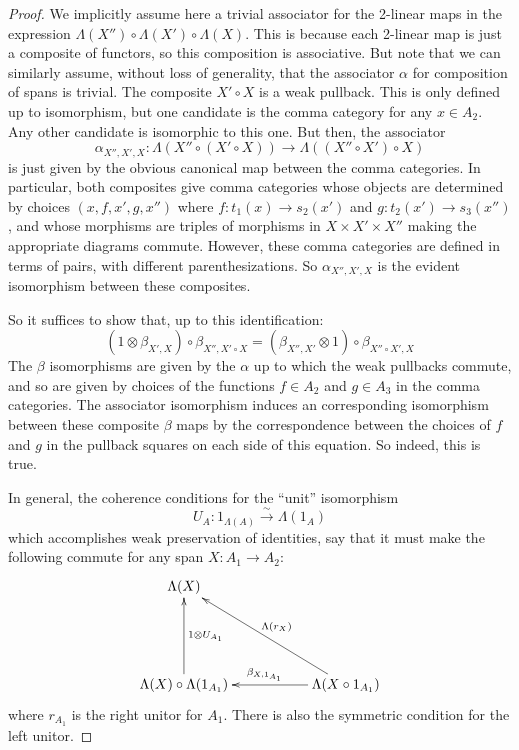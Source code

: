 \documentclass[10pt]{amsart}
\numberwithin{theorem}{subsection}
\newcommand{\ra}{\mathop{\rightarrow}}
\newcommand{\FV}{\Lambda}
\begin{document}
\begin{proof}
We implicitly assume here a trivial associator for the 2-linear maps
in the expression $\FV(X'') \circ \FV(X') \circ \FV(X)$.  This is
because each 2-linear map is just a composite of functors, so this
composition is associative.  But note that we can similarly assume,
without loss of generality, that the associator $\alpha$ for
composition of spans is trivial.  The composite $X' \circ X$ is a weak
pullback.  This is only defined up to isomorphism, but one candidate
is the comma category for any $x \in A_2$.  Any other candidate is
isomorphic to this one.  But then, the associator
\begin{equation}
\alpha_{X'',X',X} : \FV( X'' \circ (X' \circ X) ) \ra \FV( (X'' \circ X') \circ X )
\end{equation}
is just given by the obvious canonical map between the comma
categories.  In particular, both composites give comma categories
whose objects are determined by choices $(x,f,x',g,x'')$ where $f :
t_1(x) \ra s_2(x')$ and $g : t_2(x') \ra s_3(x'')$, and whose
morphisms are triples of morphisms in $X \times X' \times X''$ making
the appropriate diagrams commute.  However, these comma categories are
defined in terms of pairs, with different parenthesizations.  So
$\alpha_{X'',X',X}$ is the evident isomorphism between these
composites.

So it suffices to show that, up to this identification:
\begin{equation}
(1 \otimes \beta_{X',X}) \circ \beta_{X'',X'\circ X} = (\beta_{X'',X'} \otimes 1) \circ \beta_{X'' \circ X',X}
\end{equation}
The $\beta$ isomorphisms are given by the $\alpha$ up to which the weak pullbacks commute, and so are given by choices of the functions $f \in A_2$ and $g \in A_3$ in the comma categories.  The associator isomorphism induces an corresponding isomorphism between these composite $\beta$ maps by the correspondence between the choices of $f$ and $g$ in the pullback squares on each side of this equation.  So indeed, this is true.

In general, the coherence conditions for the ``unit'' isomorphism
\begin{equation}
U_A : 1_{\FV(A)} \stackrel{\sim}{\ra} \FV(1_A)
\end{equation}
which accomplishes weak preservation of identities, say that it must
make the following commute for any span $X: A_1 \ra A_2$:
\begin{equation}\label{eq:wk2fncunit}
\xymatrix{
\FV(X)  & & \\
 & &  \\
\FV(X) \circ \FV(1_{A_1}) \ar[uu]_{1 \otimes U_{A_1}} &  & \FV(X \circ 1_{A_1})\ar[uull]_{\FV(r_X)} \ar[ll]_{\beta_{X,1_{A_1}}}
}
\end{equation}
where $r_{A_1}$ is the right unitor for $A_1$.  There is also the symmetric
condition for the left unitor.


\end{proof}
\end{document}
